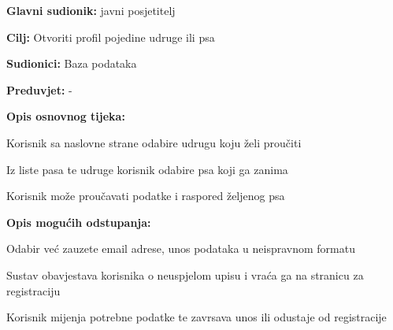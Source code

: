 				\noindent {}
				\begin{packed_item}
					
					\item \textbf{Glavni sudionik:} javni posjetitelj
					\item  \textbf{Cilj:} Otvoriti profil pojedine udruge ili psa
					\item  \textbf{Sudionici:} Baza podataka
					\item  \textbf{Preduvjet:} -
					\item  \textbf{Opis osnovnog tijeka:}
					
					\item[] \begin{packed_enum}
						
						\item Korisnik sa naslovne strane odabire udrugu koju želi proučiti
						\item Iz liste pasa te udruge korisnik odabire psa koji ga zanima
						\item Korisnik može proučavati podatke i raspored željenog psa
					\end{packed_enum}
					
					\item  \textbf{Opis mogućih odstupanja:}
					
					\item[] \begin{packed_item}
						
						\item [2.a] Odabir već zauzete email adrese, unos podataka u neispravnom formatu
						\item[] \begin{packed_enum}
							
							\item Sustav obavjestava korisnika o neuspjelom upisu i vraća ga na stranicu za registraciju
							\item Korisnik mijenja potrebne podatke te zavrsava unos ili odustaje od registracije
							
						\end{packed_enum}
					\end{packed_item}
				\end{packed_item}
			
			
	
